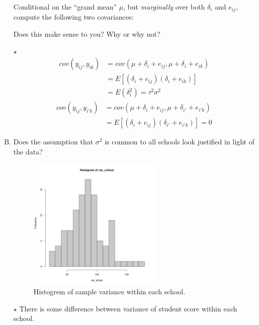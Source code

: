 \documentclass[11pt]{article}
\newcommand{\jie}{$\star$ }
\begin{document}
\begin{enumerate}[(A)]
Conditional on the ``grand mean'' $\mu$, but \emph{marginally} over both $\delta_i$ and $e_{ij}$, compute the following two covariances:


Does this make sense to you?  Why or why not?  

\bigskip
\jie
\begin{align*}
    cov(y_{ij}, y_{ik}) &= cov(\mu + \delta_i + e_{ij}, \mu + \delta_i + e_{ik}) \\
    &= E[(\delta_i + e_{ij})(\delta_i + e_{ik})] \\
    &= E(\delta_i^2) = \tau^2 \sigma^2
\end{align*}
\begin{align*}
    cov(y_{ij}, y_{i'k}) &= cov(\mu + \delta_i + e_{ij}, \mu + \delta_{i'} + e_{i'k}) \\
    &=E[(\delta_i + e_{ij})(\delta_{i'} + e_{i'k})] = 0
\end{align*}

\item Does the assumption that $\sigma^2$ is common to all schools look justified in light of the data?  
\bigskip
\begin{figure}[h]
    \centering
    \includegraphics[width=0.6\textwidth]{Ex4/figures/var_school.jpeg}
    \caption{Histogrem of sample variance within each school.}
    \label{fig:bary_n}
\end{figure}
\jie There is some difference between variance of student score within each school.


\end{enumerate}
\end{document}
